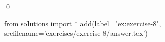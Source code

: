 
\begin{ex} 
  \label{ex:exercise-8}
  
  \qed
\end{ex} 
\begin{python0}
from solutions import *
add(label="ex:exercise-8",
    srcfilename='exercises/exercise-8/answer.tex') 
\end{python0}

